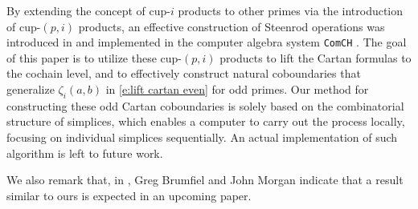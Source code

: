 By extending the concept of cup-$i$ products to other primes via the introduction of cup-$(p,i)$ products, an effective construction of Steenrod operations was introduced in \cite{medina2021may_st} and implemented in the computer algebra system \texttt{ComCH} \cite{medina2021comch}.
The goal of this paper is to utilize these cup-$(p,i)$ products to lift the Cartan formulas to the cochain level, and to effectively construct natural coboundaries that generalize $\zeta_i(a,b)$ in \cref{e:lift cartan even} for odd primes.
Our method for constructing these odd Cartan coboundaries is solely based on the combinatorial structure of simplices, which enables a computer to carry out the process locally, focusing on individual simplices sequentially.
An actual implementation of such algorithm is left to future work.

We also remark that, in \cite{brumfiel2023explicit}, Greg Brumfiel and John Morgan indicate that a result similar to ours is expected in an upcoming paper.